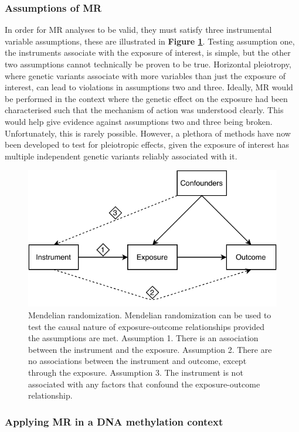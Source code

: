 \documentclass[11pt,oneside]{bristolthesis}
\begin{document}
\hypertarget{assumptions-of-mr}{%
\subsubsection{Assumptions of MR}\label{assumptions-of-mr}}

In order for MR analyses to be valid, they must satisfy three instrumental variable assumptions, these are illustrated in \textbf{Figure \ref{fig:mr-diagram}}. Testing assumption one, the instruments associate with the exposure of interest, is simple, but the other two assumptions cannot technically be proven to be true. Horizontal pleiotropy, where genetic variants associate with more variables than just the exposure of interest, can lead to violations in assumptions two and three. Ideally, MR would be performed in the context where the genetic effect on the exposure had been characterised such that the mechanism of action was understood clearly. This would help give evidence against assumptions two and three being broken. Unfortunately, this is rarely possible. However, a plethora of methods have now been developed to test for pleiotropic effects, given the exposure of interest has multiple independent genetic variants reliably associated with it.


\begin{figure}

{\centering \includegraphics[width=1\linewidth]{figure/01-introduction/mr-diagram} 

}

\caption{Mendelian randomization. Mendelian randomization can be used to test the causal nature of exposure-outcome relationships provided the assumptions are met. Assumption 1. There is an association between the instrument and the exposure. Assumption 2. There are no associations between the instrument and outcome, except through the exposure. Assumption 3. The instrument is not associated with any factors that confound the exposure-outcome relationship.}\label{fig:mr-diagram}
\end{figure}
\hypertarget{applying-mr-in-a-dna-methylation-context}{%
\subsubsection{Applying MR in a DNA methylation context}\label{applying-mr-in-a-dna-methylation-context}}
\end{document}

